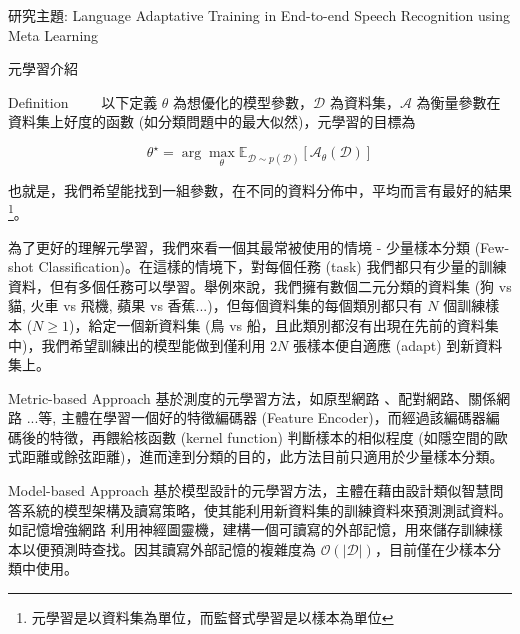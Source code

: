 \documentclass[12pt]{extarticle}
\begin{document}
\begin{section}{研究主題: Language Adaptative Training in End-to-end Speech Recognition using Meta Learning}
\begin{subsection}{元學習介紹}
    \begin{subsubsection}{Definition}
      ~~~~以下定義 $\theta$ 為想優化的模型參數，$\mathcal{D}$ 為資料集，$\mathcal{A}$ 為衡量參數在資料集上好度的函數 (如分類問題中的最大似然)，元學習的目標為

      \begin{equation}
        \theta^{\star} = \arg \max_\theta \mathbb{E}_{\mathcal{D} \sim p(\mathcal{D}) }[\mathcal{A}_\theta(\mathcal{D})]
      \end{equation}

      也就是，我們希望能找到一組參數，在不同的資料分佈中，平均而言有最好的結果\footnote{元學習是以資料集為單位，而監督式學習是以樣本為單位}。

      為了更好的理解元學習，我們來看一個其最常被使用的情境 - 少量樣本分類 (Few-shot Classification)。在這樣的情境下，對每個任務 (task) 我們都只有少量的訓練資料，但有多個任務可以學習。舉例來說，我們擁有數個二元分類的資料集 (狗 vs 貓, 火車 vs 飛機, 蘋果 vs 香蕉...)，但每個資料集的每個類別都只有 $N$ 個訓練樣本 ($N \geq 1$)，給定一個新資料集 (鳥 vs 船，且此類別都沒有出現在先前的資料集中)，我們希望訓練出的模型能做到僅利用 $2N$ 張樣本便自適應 (adapt) 到新資料集上。


    \end{subsubsection}

    \begin{subsubsection}{Metric-based Approach}
      基於測度的元學習方法，如原型網路 \cite{snell2017prototypical}、配對網路\cite{vinyals2016matching}、關係網路 \cite{sung2018learning}...等, 主體在學習一個好的特徵編碼器 (Feature Encoder)，而經過該編碼器編碼後的特徵，再餵給核函數 (kernel function) 判斷樣本的相似程度 (如隱空間的歐式距離或餘弦距離)，進而達到分類的目的，此方法目前只適用於少量樣本分類。
    \end{subsubsection}

    \begin{subsubsection}{Model-based Approach}
      基於模型設計的元學習方法，主體在藉由設計類似智慧問答系統的模型架構及讀寫策略，使其能利用新資料集的訓練資料來預測測試資料。如記憶增強網路 \cite{santoro2016meta}利用神經圖靈機，建構一個可讀寫的外部記憶，用來儲存訓練樣本以便預測時查找。因其讀寫外部記憶的複雜度為 $\mathcal{O}(|\mathcal{D}|)$，目前僅在少樣本分類中使用。
    \end{subsubsection}


\end{subsection}
\end{section}
\end{document}
